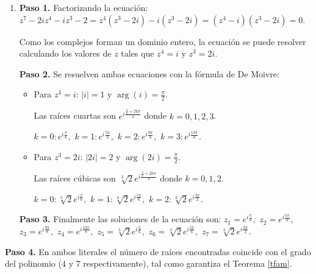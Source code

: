 \begin{example}
\begin{myproof}
\begin{enumerate}[$a)$]
\begin{itemize}
$k=0:  e^{i\frac{5\pi/3}{2}} = \boxed{e^{i\frac{5\pi}{6}}}$ y  $k=1: e^{i\frac{5\pi/3+2\pi}{2}} = \boxed{e^{i\frac{11\pi}{6}}}$
\end{itemize}

\textbf{Paso 3.} Finalmente las soluciones de la ecuación son:
$$z_1 = e^{i\frac{\pi}{6}}, \quad z_2 = e^{i\frac{5\pi}{6}}, \quad z_3 = e^{i\frac{7\pi}{6}}, \quad z_4 = e^{i\frac{11\pi}{6}}$$

\item \textbf{Paso 1.} Factorizando la ecuación: $z^7-2iz^4-iz^3-2=z^4(z^3-2i)-i(z^3-2i)=(z^4-i)(z^3-2i)= 0.$

Como los complejos forman un dominio entero, la ecuación se puede resolver calculando los valores de $z$ tales que $z^4=i$ y $z^3=2i$.

\textbf{Paso 2.} Se resuelven ambas ecuaciones con la fórmula de De Moivre:

\begin{itemize}
\item Para $z^4=i$: $|i|=1$ y $\arg(i)=\frac{\pi}{2}$.

Las raíces cuartas son $e^{i\frac{\frac{\pi}{2}+2k\pi}{4}}$ donde $k=0,1,2,3$.

$k=0:\boxed{e^{i\frac{\pi}{8}}},$ $k=1: \boxed{e^{i\frac{5\pi}{8}}},$ $k=2: \boxed{e^{i\frac{9\pi}{8}}},$ $k=3: \boxed{e^{i\frac{13\pi}{8}}}.$

\item Para $z^3=2i$: $|2i|=2$ y $\arg(2i)=\frac{\pi}{2}$.

Las raíces cúbicas son $\sqrt[3]{2} e^{i\frac{\frac{\pi}{2}+2k\pi}{3}}$ donde $k=0,1,2$.

$k=0: \boxed{\sqrt[3]{2}e^{i\frac{\pi}{6}}},$ $k=1: \boxed{\sqrt[3]{2}e^{i\frac{5\pi}{6}}},$ $k=2: \boxed{\sqrt[3]{2}e^{i\frac{3\pi}{2}}}.$
\end{itemize}

\textbf{Paso 3.} Finalmente las soluciones de la ecuación son:
$z_1 = e^{i\frac{\pi}{8}},$ $z_2 = e^{i\frac{5\pi}{8}},$ $z_3 = e^{i\frac{9\pi}{8}},$ $z_4 = e^{i\frac{13\pi}{8}},$ $z_5 = \sqrt[3]{2}e^{i\frac{\pi}{6}},$ $z_6 = \sqrt[3]{2}e^{i\frac{5\pi}{6}},$ $z_7 = \sqrt[3]{2}e^{i\frac{3\pi}{2}}.$
\end{enumerate}

\textbf{Paso 4.} En ambos literales el número de raíces encontradas coincide con el grado del polinomio ($4$ y $7$ respectivamente), tal como garantiza el Teorema \ref{tfam}.
\end{myproof}
\end{example}

